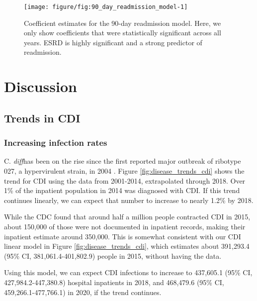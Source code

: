 \documentclass[12pt]{ociamthesis}\usepackage[]{graphicx}\usepackage[]{color}
\newenvironment{knitrout}{}{} %
\newcommand{\cdiff}{C. \textit{diff}}
\newcommand{\ci}[3]{#1 (95\% CI, #2-#3)}
\begin{document}
\begin{knitrout}
\color{fgcolor}\begin{figure}

{\centering \texttt{[image: figure/fig:90\_day\_readmission\_model-1]} 

}

\caption[Coefficient estimates for the 90-day readmission model]{Coefficient estimates for the 90-day readmission model. Here, we only show coefficients that were statistically significant across all years. ESRD is highly significant and a strong predictor of readmission.}\label{fig:fig:90_day_readmission_model}
\end{figure}


\end{knitrout}




\chapter{Discussion}

\section{Trends in CDI}


\subsection{Increasing infection rates}

\cdiff has been on the rise since the first reported major outbreak of ribotype 027, a hypervirulent strain, in 2004 \cite{Pepin2004}. 
Figure \ref{fig:disease_trends_cdi} shows the trend for CDI using the data from 2001-2014, extrapolated through 2018. 
Over 1\% of the inpatient population in 2014 was diagnosed with CDI. If this trend continues linearly, we can expect that number
to increase to nearly 1.2\% by 2018. 

While the CDC found that around half a million people contracted CDI in 2015, about 150,000 of those were not documented in 
inpatient records, making their inpatient estimate around 350,000. \cite{CDC2018} This is somewhat consistent with our CDI linear model in 
Figure \ref{fig:disease_trends_cdi}, which estimates about \ci{391,293.4}{381,061.4}{401,802.9} people in 2015,
without having the data.

Using this model, we can expect CDI infections to increase to \ci{437,605.1}{427,984.2}{447,380.8} hospital inpatients in 2018, and
\ci{468,479.6}{459,266.1}{477,766.1} in 2020, if the trend continues.
\end{document}
